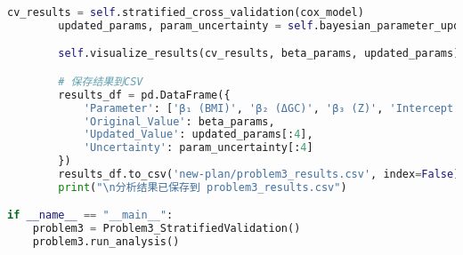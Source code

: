 \documentclass[UTF8, a4paper, 11pt]{ctexart}
\begin{document}
\begin{lstlisting}[language=Python, caption={问题三的解决方案脚本。}]
        cv_results = self.stratified_cross_validation(cox_model)
        updated_params, param_uncertainty = self.bayesian_parameter_update(beta_params)

        self.visualize_results(cv_results, beta_params, updated_params)

        # 保存结果到CSV
        results_df = pd.DataFrame({
            'Parameter': ['β₁ (BMI)', 'β₂ (ΔGC)', 'β₃ (Z)', 'Intercept'],
            'Original_Value': beta_params,
            'Updated_Value': updated_params[:4],
            'Uncertainty': param_uncertainty[:4]
        })
        results_df.to_csv('new-plan/problem3_results.csv', index=False)
        print("\n分析结果已保存到 problem3_results.csv")

if __name__ == "__main__":
    problem3 = Problem3_StratifiedValidation()
    problem3.run_analysis()
\end{lstlisting}
\end{document}
